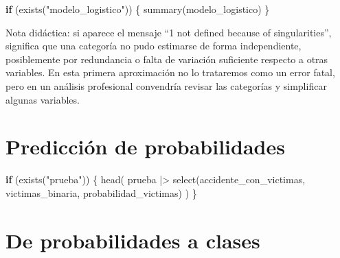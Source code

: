\documentclass[
  11pt,
  letterpaper,
]{book}
\newenvironment{Shaded}{\begin{snugshade}}{\end{snugshade}}
\newcommand{\AttributeTok}[1]{\textcolor[rgb]{0.40,0.45,0.13}{#1}}
\newcommand{\ControlFlowTok}[1]{\textcolor[rgb]{0.00,0.23,0.31}{\textbf{#1}}}
\newcommand{\FunctionTok}[1]{\textcolor[rgb]{0.28,0.35,0.67}{#1}}
\newcommand{\NormalTok}[1]{\textcolor[rgb]{0.00,0.23,0.31}{#1}}
\newcommand{\OtherTok}[1]{\textcolor[rgb]{0.00,0.23,0.31}{#1}}
\newcommand{\SpecialCharTok}[1]{\textcolor[rgb]{0.37,0.37,0.37}{#1}}
\newcommand{\StringTok}[1]{\textcolor[rgb]{0.13,0.47,0.30}{#1}}
\begin{document}
\begin{Shaded}
\begin{Highlighting}[]
\ControlFlowTok{if}\NormalTok{ (}\FunctionTok{exists}\NormalTok{(}\StringTok{"modelo\_logistico"}\NormalTok{)) \{}
  \FunctionTok{summary}\NormalTok{(modelo\_logistico)}
\NormalTok{\}}
\end{Highlighting}
\end{Shaded}

Nota didáctica: si aparece el mensaje ``1 not defined because of
singularities'', significa que una categoría no pudo estimarse de forma
independiente, posiblemente por redundancia o falta de variación
suficiente respecto a otras variables. En esta primera aproximación no
lo trataremos como un error fatal, pero en un análisis profesional
convendría revisar las categorías y simplificar algunas variables.

\section{Predicción de
probabilidades}\label{predicciuxf3n-de-probabilidades}

\begin{Shaded}
\end{Shaded}

\begin{Shaded}
\begin{Highlighting}[]
\ControlFlowTok{if}\NormalTok{ (}\FunctionTok{exists}\NormalTok{(}\StringTok{"prueba"}\NormalTok{)) \{}
  \FunctionTok{head}\NormalTok{(}
\NormalTok{    prueba }\SpecialCharTok{|\textgreater{}}
      \FunctionTok{select}\NormalTok{(accidente\_con\_victimas, victimas\_binaria, probabilidad\_victimas)}
\NormalTok{  )}
\NormalTok{\}}
\end{Highlighting}
\end{Shaded}

\section{De probabilidades a clases}\label{de-probabilidades-a-clases}
\end{document}
